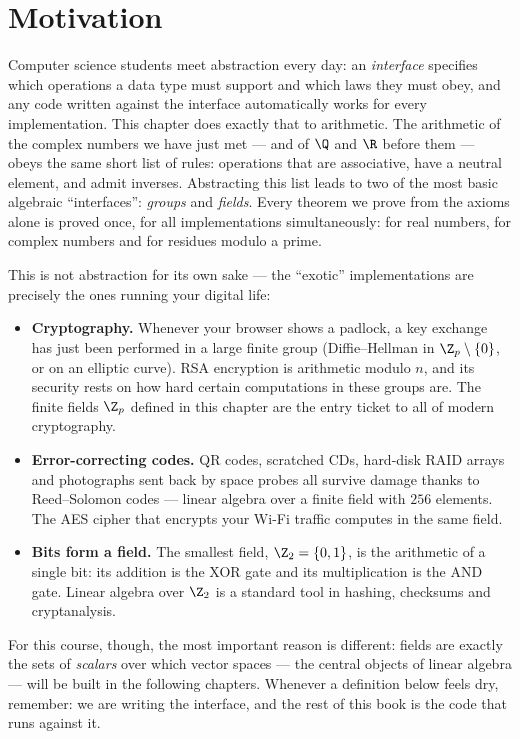 \section{Motivation}

Computer science students meet abstraction every day: an \emph{interface} specifies which operations a
data type must support and which laws they must obey, and any code written against the interface
automatically works for every implementation. This chapter does exactly that to arithmetic. The arithmetic
of the complex numbers we have just met — and of $\Q$ and $\R$ before them — obeys the same short list of
rules: operations that are associative, have a neutral element, and admit inverses. Abstracting this list
leads to two of the most basic algebraic ``interfaces'': \emph{groups} and \emph{fields}. Every theorem we
prove from the axioms alone is proved once, for all implementations simultaneously: for real numbers, for
complex numbers and for residues modulo a prime.

This is not abstraction for its own sake — the ``exotic'' implementations are precisely the ones running
your digital life:

\begin{itemize}
\item \textbf{Cryptography.} Whenever your browser shows a padlock, a key exchange has just been performed
in a large finite group (Diffie--Hellman in $\Z_p\setminus\{0\}$, or on an elliptic curve). RSA encryption
is arithmetic modulo $n$, and its security rests on how hard certain computations in these groups are. The
finite fields $\Z_p$ defined in this chapter are the entry ticket to all of modern cryptography.
\item \textbf{Error-correcting codes.} QR codes, scratched CDs, hard-disk RAID arrays and photographs sent
back by space probes all survive damage thanks to Reed--Solomon codes — linear algebra over a finite field
with $256$ elements. The AES cipher that encrypts your Wi-Fi traffic computes in the same field.
\item \textbf{Bits form a field.} The smallest field, $\Z_2=\{0,1\}$, is the arithmetic of a single bit:
its addition is the XOR gate and its multiplication is the AND gate. Linear algebra over $\Z_2$ is a
standard tool in hashing, checksums and cryptanalysis.
\end{itemize}

For this course, though, the most important reason is different: fields are exactly the sets of
\emph{scalars} over which vector spaces — the central objects of linear algebra — will be built in the
following chapters. Whenever a definition below feels dry, remember: we are writing the interface, and the
rest of this book is the code that runs against it.

